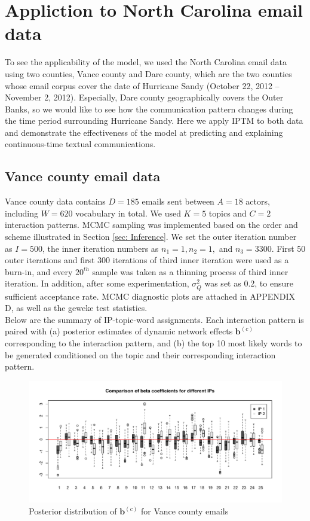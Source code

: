 \documentclass[a4paper]{article}
\begin{document}
 \section{Appliction to North Carolina email data}  \label{sec: Application to North Carolina email data}
 To see the applicability of the model, we used the North Carolina email data using two counties, Vance county and Dare county, which are the two counties whose email corpus cover the date of Hurricane Sandy (October 22, 2012 – November 2, 2012). Especially, Dare county geographically covers the Outer Banks, so we would like to see how the communication pattern changes during the time period surrounding Hurricane Sandy. Here we apply IPTM to both data and demonstrate the effectiveness of the model at predicting and explaining continuous-time textual communications.
 \subsection{Vance county email data} \label{subsec: Vance county email data}
Vance county data contains $D=185$ emails sent between $A=18$ actors, including $W=620$ vocabulary in total. We used $K=5$ topics and $C=2$ interaction patterns. MCMC sampling was implemented based on the order and scheme illustrated in Section \ref{sec: Inference}. We set the outer iteration number as $I=500$, the inner iteration numbers as $n_1=1, n_2=1,$ and $n_3=3300$. First 50 outer iterations and first 300 iterations of third inner iteration were used as a burn-in, and every $20^{th}$ sample was taken as a thinning process of third inner iteration. In addition, after some experimentation, $\sigma_Q^2$ was set as 0.2, to ensure sufficient acceptance rate. MCMC diagnostic plots are attached in APPENDIX D, as well as the geweke test statistics. \\\newline
 Below are the summary of IP-topic-word assignments. Each interaction pattern is paired with (a) posterior estimates of dynamic network effects $\boldsymbol{b}^{(c)}$ corresponding to the interaction pattern, and (b) the top 10 most likely words to be generated conditioned on the topic and their corresponding interaction pattern.
 \begin{figure}[ht]
 	\centering
 	 	\includegraphics[width=1\textwidth]{betaplot.pdf} 
 	\caption{Posterior distribution of  $\boldsymbol{b}^{(c)}$ for Vance county emails}
 	\label{fig:Vanceboxplot}
 \end{figure}
\end{document}
